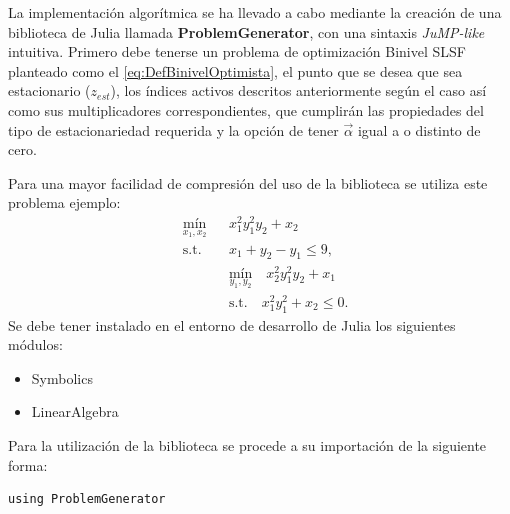 La implementación algorítmica se ha llevado a cabo mediante la creación de una biblioteca de Julia
llamada \textbf{ProblemGenerator}, con una sintaxis \textit{JuMP-like} intuitiva.
Primero debe tenerse un problema de optimización Binivel SLSF planteado como el \ref{eq:DefBinivelOptimista}, el punto que se desea que sea estacionario ($z_{est}$), los índices activos descritos anteriormente 
según el caso así como sus multiplicadores correspondientes, que cumplirán las propiedades del tipo de estacionariedad requerida y la opción de tener  $\vec{\alpha}$ igual a o distinto de cero.

Para una mayor facilidad de compresión del uso de la biblioteca se utiliza este problema ejemplo:
\begin{equation}
    \begin{aligned}
        & \underset{x_1, x_2}{\text{mín}} 
        && x_1^2 y_1^2 y_2 + x_2 \\
        & \text{s.t.} 
        && x_1 + y_2 - y_1 \leq 9, \\
        & 
        && \underset{y_1, y_2}{\text{mín}} 
        \quad x_2^2 y_1^2 y_2 + x_1 \\
        & 
        && \text{s.t.} 
        \quad x_1^2 y_1^2 + x_2 \leq 0.
    \end{aligned}
    \label{ProblemaEjemplo}
\end{equation}
Se debe tener instalado en el entorno de desarrollo de Julia los siguientes módulos:
\begin{itemize}
    \item Symbolics 
    \item LinearAlgebra
\end{itemize}

Para la utilización de la biblioteca se procede a su importación de la siguiente forma:
\begin{lstlisting}[caption=Importar el Módulo]
    using ProblemGenerator
\end{lstlisting}

